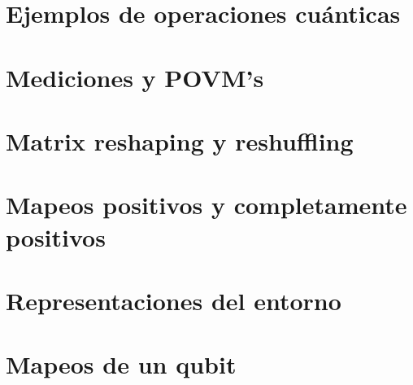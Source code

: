 \section{Ejemplos de operaciones cuánticas}

\section{Mediciones y POVM's}

\section{Matrix reshaping y reshuffling}

\section{Mapeos positivos y completamente positivos}

\section{Representaciones del entorno}

\section{Mapeos de un qubit}



